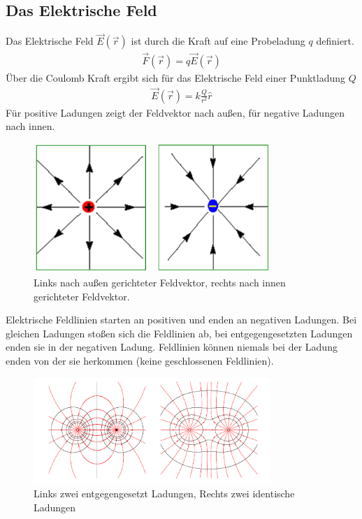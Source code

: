 \documentclass{article}
\begin{document}
\subsection{Das Elektrische Feld}
Das Elektrische Feld $\vec{E}(\vec{r})$ ist durch die Kraft auf eine Probeladung $q$ definiert.
\begin{align}
    \vec{F}(\vec{r})=q\vec{E}(\vec{r})
\end{align}
Über die Coulomb Kraft ergibt sich für das Elektrische Feld einer Punktladung $Q$
\begin{align}
    \vec{E}(\vec{r})=k\frac{Q}{r^2}\hat{r}
\end{align}
Für positive Ladungen zeigt der Feldvektor nach außen, für negative Ladungen nach innen.
\begin{figure}[H]
    \centering
    \includegraphics[width=0.80\textwidth]{Elektrisches Feld .png}
    \caption{Links nach außen gerichteter Feldvektor, rechts nach innen gerichteter Feldvektor.}
\end{figure}
Elektrische Feldlinien starten an positiven und enden an negativen Ladungen. 
Bei gleichen Ladungen stoßen sich die Feldlinien ab, bei entgegengesetzten Ladungen enden sie in der negativen Ladung.
Feldlinien können niemals bei der Ladung enden von der sie herkommen (keine geschlossenen Feldlinien).
\begin{figure}[H]
    \centering
    \includegraphics[width=0.80\textwidth]{Elektrisches Feld Ladungen.png}
    \caption{Links zwei entgegengesetzt Ladungen, Rechts zwei identische Ladungen}
\end{figure}
\end{document}
